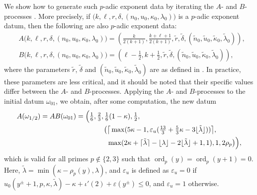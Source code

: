 \documentclass[11pt,reqno]{amsart}
\numberwithin{equation}{section}
\theoremstyle{plain}
\theoremstyle{definition}
\begin{document}
We show how to generate such $p$-adic exponent data by iterating the $A$- and $B$-processes \cite[Theorems 5\,\&\,4]{MD}. More precisely, if $\big(k,\ell,r,\delta,(n_0,u_0,\kappa_0,\lambda_0)\big)$ is a $p$-adic exponent datum, then the following are also $p$-adic exponent data:
\begin{align*}
&A\big(k,\ell,r,\delta,(n_0,u_0,\kappa_0,\lambda_0)\big) = \left( \frac{k}{2(k+1)}, \frac{k+\ell+1}{2(k+1)}, \tilde{r}, \tilde{\delta}, (\tilde{n}_0, \tilde{u}_0, \tilde{\kappa}_0, \tilde{\lambda}_0) \right),\\
&B\big(k,\ell,r,\delta,(n_0,u_0,\kappa_0,\lambda_0)\big) = \left( \ell-\frac{1}{2}, k+\frac{1}{2}, \tilde{r}, \tilde{\delta}, (\tilde{n}_0, \tilde{u}_0, \tilde{\kappa}_0, \tilde{\lambda}_0) \right),
\end{align*}
where the parameters $\tilde{r}$, $\tilde{\delta}$ and $(\tilde{n}_0, \tilde{u}_0, \tilde{\kappa}_0, \tilde{\lambda}_0)$ are as defined in \cite[Theorems 5\,\&\,4]{MD}.
In practice, these parameters are less critical, and it should be noted that their specific values differ between the $A$- and $B$-processes.
Applying the $A$- and $B$-processes to the initial datum $\omega_{01}$, 
we obtain, after some computation, the new datum
\begin{align*}
A(\omega_{1/2})=AB(\omega_{01})&=\Big(\tfrac16,\tfrac23,\tfrac16(1-\kappa),\tfrac12,\\
&\qquad\qquad\big(\big\lceil\max(5\kappa-1,\varepsilon_u(\tfrac{13}3+\tfrac53\kappa-3\lfloor\tilde{\lambda}\rfloor)) \big\rceil,\\
&\qquad\qquad\hphantom{\big(}\max(2\kappa+\lceil\tilde{\lambda}\rceil-\lfloor\lambda\rfloor
-2\lfloor\tilde{\lambda}\rfloor+1,1),1,2\rho_p\big)\Big),
\end{align*}
which is valid for all primes $p\not\in\{2,3\}$ such that $\operatorname{ord}_p(y) = \operatorname{ord}_p(y+1) = 0$. Here, $\tilde{\lambda} = \min( \kappa - \rho_p(y), \lambda )$, and $\varepsilon_u$ is defined as $\varepsilon_u=0$ if $u_0(y^{\pm}+1,p,\kappa,\tilde{\lambda})-\kappa+\iota'(2)+\varepsilon(y^{\pm})\leqslant 0$, and $\varepsilon_u=1$ otherwise.
\end{document}
